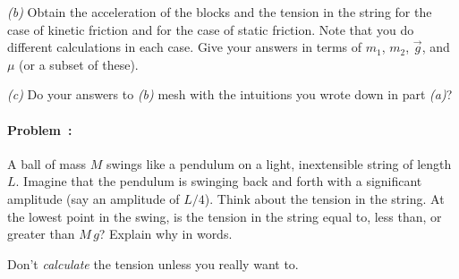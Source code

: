\documentclass[12pt]{article}
\begin{document}
\textsl{(b)} Obtain the acceleration of the blocks and the tension in
the string for the case of kinetic friction and for the case of static
friction.  Note that you do different calculations in each case.  Give
your answers in terms of $m_1$, $m_2$, $\vec{g}$, and $\mu$ (or a
subset of these).

\textsl{(c)} Do your answers to \textsl{(b)} mesh
with the intuitions you wrote down in part \textsl{(a)}?

\paragraph{Problem~\theproblem:}%
A ball of mass $M$ swings like a pendulum on a light, inextensible
string of length $L$.  Imagine that the pendulum is swinging back and
forth with a significant amplitude (say an amplitude of $L/4$).  Think
about the tension in the string.  At the lowest point in the swing, is
the tension in the string equal to, less than, or greater than $M\,g$?
Explain why in words.

Don't \emph{calculate} the tension unless you really want to.
\end{document}
